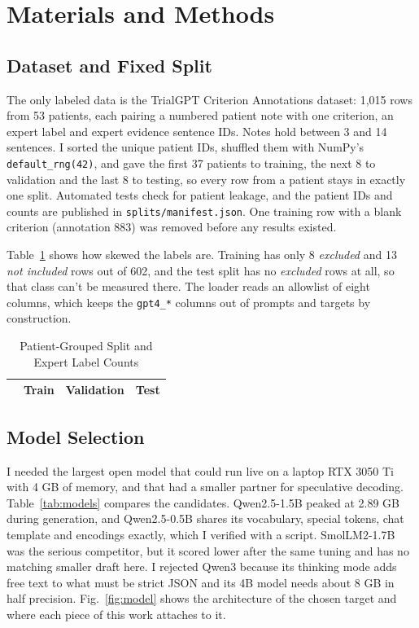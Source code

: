 \documentclass[conference]{IEEEtran}
\begin{document}
\section{Materials and Methods}

\subsection{Dataset and Fixed Split}

The only labeled data is the TrialGPT Criterion Annotations dataset: 1,015 rows from 53 patients, each pairing a numbered patient note with one criterion, an expert label and expert evidence sentence IDs. Notes hold between 3 and 14 sentences. I sorted the unique patient IDs, shuffled them with NumPy's \texttt{default\_rng(42)}, and gave the first 37 patients to training, the next 8 to validation and the last 8 to testing, so every row from a patient stays in exactly one split. Automated tests check for patient leakage, and the patient IDs and counts are published in \texttt{splits/manifest.json}. One training row with a blank criterion (annotation 883) was removed before any results existed.

Table~\ref{tab:split} shows how skewed the labels are. Training has only 8 \emph{excluded} and 13 \emph{not included} rows out of 602, and the test split has no \emph{excluded} rows at all, so that class can't be measured there. The loader reads an allowlist of eight columns, which keeps the \texttt{gpt4\_*} columns out of prompts and targets by construction.

\begin{table}[t]
\caption{Patient-Grouped Split and Expert Label Counts}
\label{tab:split}
\centering
\footnotesize
\begin{tabular}{@{}lrrr@{}}
\toprule
 & Train & Validation & Test \\
\midrule

\end{tabular}
\end{table}

\subsection{Model Selection}

I needed the largest open model that could run live on a laptop RTX 3050 Ti with 4 GB of memory, and that had a smaller partner for speculative decoding. Table~\ref{tab:models} compares the candidates. Qwen2.5-1.5B \cite{qwen2025report} peaked at 2.89 GB during generation, and Qwen2.5-0.5B shares its vocabulary, special tokens, chat template and encodings exactly, which I verified with a script. SmolLM2-1.7B \cite{benallal2025smollm2} was the serious competitor, but it scored lower after the same tuning and has no matching smaller draft here. I rejected Qwen3 \cite{qwen3report} because its thinking mode adds free text to what must be strict JSON and its 4B model needs about 8 GB in half precision. Fig.~\ref{fig:model} shows the architecture of the chosen target and where each piece of this work attaches to it.
\end{document}
